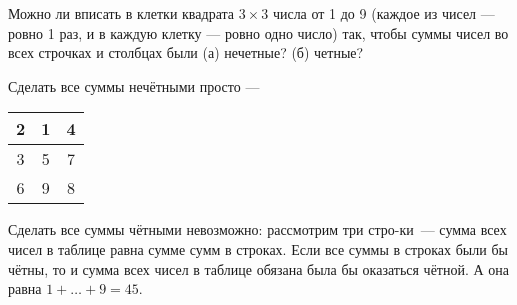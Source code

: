 \begin{itemize}

	\itB Можно ли вписать в клетки квадрата $3\times 3$ числа от 1 до 9 (каждое из чисел — ровно 1 раз, и в каждую клетку — ровно одно число) так, чтобы суммы чисел во всех строчках и столбцах были (а) нечетные? (б) четные?
	
	\itr Сделать все суммы нечётными просто —
	\begin{center} \begin{tabular}{c|c|c}
		2 & 1 & 4 \\ \hline
		3 & 5 & 7 \\ \hline
		6 & 9 & 8 
	\end{tabular} \end{center}
	
	Сделать все суммы чётными невозможно: рассмотрим три стро-\linebreak ки~— сумма всех чисел в таблице равна сумме сумм в строках. Если все суммы в строках были бы чётны, то и сумма всех чисел в таблице обязана была бы оказаться чётной. А она равна $1 + \ldots + 9 = 45$.

\end{itemize}


